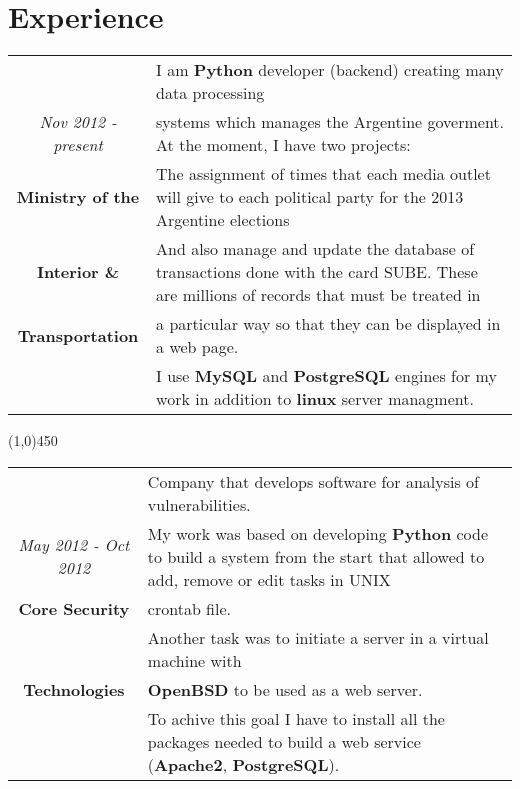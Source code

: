 \section{Experience}

\begin{tabular}{c|p{12.5cm}}
& \large I am \textbf{Python} developer (backend) creating many data processing\\
\large\textit{Nov 2012 - present} &  \large systems which manages the Argentine goverment. At the moment, I have two projects:\\
\large\textbf{Ministry of the} & \large The assignment of times that each media outlet will give to each political party for the 2013 Argentine elections\\
\large\textbf{Interior \&}& \large And also manage and update the database of transactions done with the card SUBE. These are millions of records that must be treated in \\
 \large\textbf{Transportation} & \large a particular way so that they can be displayed in a web page.\\
& \large I use \textbf{MySQL} and \textbf{PostgreSQL} engines for my work in addition to \textbf{linux} server managment.\\
\end{tabular}

\begin{center}
\line(1,0){450}
\end{center}
\begin{tabular}{c|p{12.5cm}}
& \large Company that develops software for analysis of vulnerabilities.\\
\large\textit{May 2012 - Oct 2012} &  \large My work was based on developing \textbf{Python} code to build a system from the start that allowed to add, remove or edit tasks in UNIX\\
\large\textbf{Core Security} & \large  crontab file.\\
 & \large  Another task was to initiate a server in a virtual machine with \\
\large\textbf{Technologies} & \large\textbf{OpenBSD} to be used as a web server. \\
& \large To achive this goal I have to install all the packages needed to build a web service (\textbf{Apache2}, \textbf{PostgreSQL}). \\
\end{tabular}

